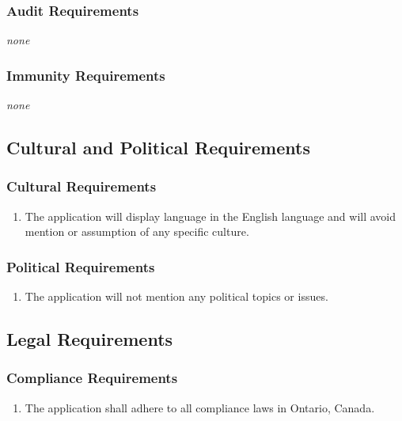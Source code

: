 \documentclass[12pt, titlepage]{article}
\begin{document}
\subsubsection{Audit Requirements}
\label{ssub:audit_requirements}
\emph{none}

\subsubsection{Immunity Requirements}
\label{ssub:immunity_requirements}
\emph{none}


\subsection{Cultural and Political Requirements}
\label{sub:cultural_and_political_requirements}

\subsubsection{Cultural Requirements}
\label{ssub:cultural_requirements}
\begin{enumerate}[{CP}1. ]
	\item The application will display language in the English language and will avoid mention or assumption of any specific culture.
\end{enumerate}

\subsubsection{Political Requirements}
\label{ssub:political_requirements}
\begin{enumerate}[{CP}2. ]
	\item The application will not mention any political topics or issues.
\end{enumerate}


\subsection{Legal Requirements}
\label{sub:legal_requirements}

\subsubsection{Compliance Requirements}
\label{ssub:compliance_requirements}
\begin{enumerate}[{LR}1. ]
	\item The application shall adhere to all compliance laws in Ontario, Canada.
\end{enumerate}
\end{document}
